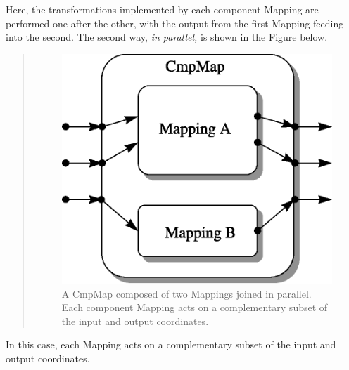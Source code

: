 \documentclass[twoside,11pt]{article}
\begin{document}
\begin{htmlonly}
   Here, the transformations implemented by each component Mapping are
   performed one after the other, with the output from the first Mapping
   feeding into the second.  The second way, {\em{in parallel,}} is shown in
   the Figure below.
   \begin{quote}
   \begin{figure}
   \label{fig:parallelcmpmap}
   \includegraphics[scale=1.0]{sun211_figures/parallel.eps}
   \caption{A CmpMap composed of two Mappings joined in parallel. Each
   component Mapping acts on a complementary subset of the input and
   output coordinates.}
   \end{figure}
   \end{quote}
\end{htmlonly}
In this case, each Mapping acts on a complementary subset of the
input and output coordinates.
\end{document}
